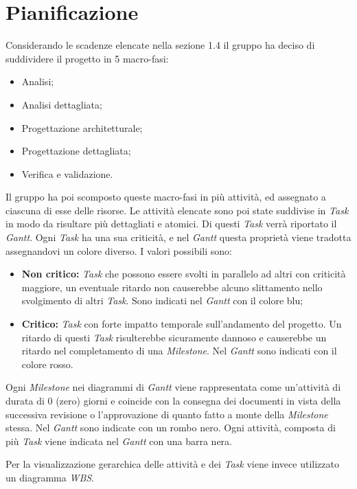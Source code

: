 \documentclass[a4paper]{report}
\newcommand{\mychapter}[2]{
	\setcounter{chapter}{#1}
	\setcounter{section}{0}
	\setcounter{subsection}{1}
	\chapter*{#2}
	\addcontentsline{toc}{chapter}{#2}
}
\begin{document}
	\mychapter{2}{Pianificazione}
		Considerando le scadenze elencate nella sezione 1.4 il gruppo ha deciso di suddividere il progetto in 5 
		macro-fasi:
		\begin{itemize}
			\item Analisi;
			\item Analisi dettagliata;
			\item Progettazione architetturale;
			\item Progettazione dettagliata;
			\item Verifica e validazione.
		\end{itemize}
		Il gruppo ha poi scomposto queste macro-fasi in più attività, ed assegnato a ciascuna di esse delle risorse.
		Le attività elencate sono poi state suddivise in \emph{Task} in modo da risultare più dettagliati e atomici.
		Di questi \emph{Task} verrà riportato il \emph{Gantt}. Ogni \emph{Task} ha una sua criticità, 
		e nel \emph{Gantt} questa proprietà viene tradotta assegnandovi un colore diverso. I valori possibili sono:
		\begin{itemize}
			\item \textbf{Non critico:} \emph{Task} che possono essere svolti in parallelo ad altri con criticità maggiore,
			un eventuale ritardo non causerebbe alcuno slittamento nello svolgimento di altri \emph{Task}. Sono indicati nel 
			\emph{Gantt} con il colore blu;
			\item \textbf{Critico:} \emph{Task} con forte impatto temporale sull'andamento del progetto. Un ritardo di questi
			\emph{Task} risulterebbe sicuramente dannoso e causerebbe un ritardo nel completamento di una 
			\emph{Milestone}. Nel \emph{Gantt} sono indicati con il colore rosso.
		\end{itemize}
		Ogni \emph{Milestone} nei diagrammi di \emph{Gantt} viene rappresentata come un'attività di durata di 0 (zero) giorni 
		e coincide con la consegna dei documenti in vista della successiva revisione o l'approvazione di quanto fatto a monte 
		della \emph{Milestone} stessa. Nel \emph{Gantt} sono indicate con un rombo nero.
		Ogni attività, composta di più \emph{Task} viene indicata nel \emph{Gantt} con una barra nera.
		
		Per la visualizzazione gerarchica delle attività e dei \emph{Task} viene invece utilizzato un diagramma \emph{WBS}.
\end{document}
